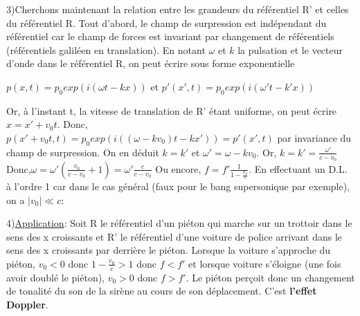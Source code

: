 \documentclass[a4paper, 12pt]{article}
\begin{document}
3)Cherchons maintenant la relation entre les grandeurs du référentiel R' et celles du référentiel R.\newline \newline
Tout d'abord, le champ de surpression est indépendant du référentiel car le champ de forces est invariant par changement de référentiels (référentiels galiléen en translation). En notant $\omega$ et $k$ la pulsation et le vecteur d'onde dans le référentiel R, on peut écrire sous forme exponentielle
\begin{center}
$p(x,t)=p_0exp(i(\omega t-kx))$ et 
$p'(x',t)=p_0exp(i(\omega't-k'x))$
\end{center}
Or, à l'instant t, la vitesse de translation de R' étant uniforme, on peut écrire $x=x'+v_0t$.\newline \newline
Donc, $p(x'+v_0t,t)=p_0exp(i((\omega -kv_0)t-kx'))=p'(x',t)$ par invariance du champ de surpression.\newline \newline
On en déduit $k=k'$ et $\omega'=\omega -kv_0$. Or, $k=k'=\frac{\omega'}{c-v_0}$\newline
Donc,\quad$\omega=\omega'(\frac{v_0}{c-v_0}+1)=\omega'\frac{c}{c-v_0}$\newline \newline
Ou encore, $f=f'\frac{1}{1-\frac{v_0}{c}}$. En effectuant un D.L. à l'ordre 1 car dans le cas général (faux pour le bang supersonique par exemple), on a $|v_0|\ll c$:\newline
\begin{center}

\end{center}
4)\underline{Application}:\newline \newline
Soit R le référentiel d'un piéton qui marche sur un trottoir dans le sens des x croissants et R' le référentiel d'une voiture de police arrivant dans le sens des x croissants par derrière le piéton. Lorsque la voiture s'approche du piéton, $v_0<0$ donc $1-\frac{v_0}{c} > 1$ donc $f<f'$ et lorsque voiture s'éloigne (une fois avoir doublé le piéton), $v_0>0$ donc $f>f'$. Le piéton perçoit donc un changement de tonalité du son de la sirène au cours de son déplacement. C'est \textbf{l'effet Doppler}.
\end{document}

